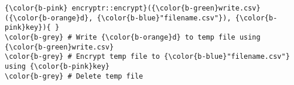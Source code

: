 \documentclass[class=minimal,border=0]{standalone}
\begin{document}
%
\begin{BVerbatim}[bgcolor=b-darkgrey]
{\color{b-pink} encryptr::encrypt}({\color{b-green}write.csv}({\color{b-orange}d}, {\color{b-blue}"filename.csv"}), {\color{b-pink}key}){ }
\color{b-grey} # Write {\color{b-orange}d} to temp file using {\color{b-green}write.csv} 
\color{b-grey} # Encrypt temp file to {\color{b-blue}"filename.csv"} using {\color{b-pink}key}
\color{b-grey} # Delete temp file
\end{BVerbatim}
\end{document}
